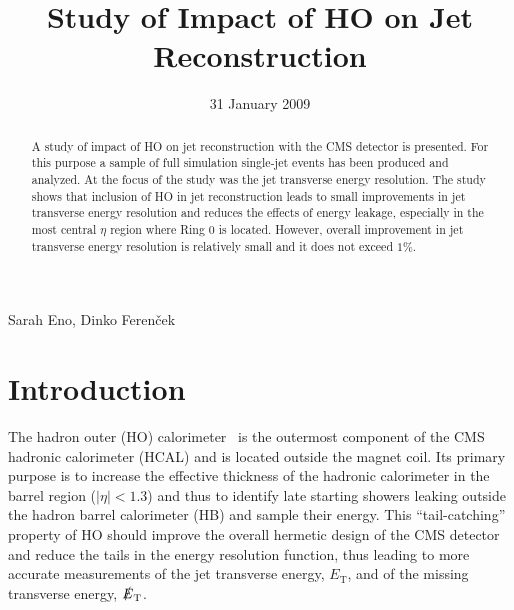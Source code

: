 \documentclass{cmspaper}
\begin{document}

\begin{titlepage}

\date{31 January 2009}

\title{Study of Impact of HO on Jet Reconstruction}

\begin{Authlist}
  Sarah Eno, Dinko Ferenček
\end{Authlist}


\begin{abstract}
A study of impact of HO on jet reconstruction with the CMS detector is presented. For this purpose a sample of full simulation single-jet events has been produced and analyzed. At the focus of the study was the jet transverse energy resolution. The study shows that inclusion of HO in jet reconstruction leads to small improvements in jet transverse energy resolution and reduces the effects of energy leakage, especially in the most central $\eta$ region where Ring $0$ is located. However, overall improvement in jet transverse energy resolution is relatively small and it does not exceed $1\%$. 
\end{abstract} 

  
\end{titlepage}

\setcounter{page}{2}%


\section{Introduction}

The hadron outer (HO) calorimeter~\cite{ref:cms-jinst} is the outermost component of the CMS hadronic calorimeter (HCAL) and is located outside the magnet coil. Its primary purpose is to increase the effective thickness of the hadronic calorimeter in the barrel region ($|\eta|<1.3$) and thus to identify late starting showers leaking outside the hadron barrel calorimeter (HB) and sample their energy. This ``tail-catching'' property of HO should improve the overall hermetic design of the CMS detector and reduce the tails in the energy resolution function, thus leading to more accurate measurements of the jet transverse energy, $E_\text{T}$, and of the missing transverse energy, $\slashed E_\text{T}$.
\end{document}

